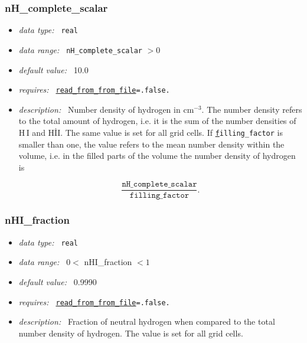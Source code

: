 \documentclass[a4paper,10pt]{article}
\begin{document}
\subsubsection{nH\_complete\_scalar}
\label{opt:nhcompletescalar}
\begin{itemize}
 \item \textit{data type:~} \texttt{real}
 \item \textit{data range:~} \texttt{nH\_complete\_scalar} $> 0$
 \item \textit{default value:~} 10.0
 \item \textit{requires:~} \texttt{\hyperref[opt:readfromfile]{read\_from\_from\_file}=.false.}
 \item \textit{description:~} Number density of hydrogen in $\mathrm{cm^{-3}}$.  
  The number density refers to the total amount of hydrogen, i.e. it is the sum 
  of the number densities of H\,I and H\.II. The same value is set for all grid 
  cells. If \texttt{\hyperref[opt:fillingfactor]filling\_factor} is smaller 
  than one, the value refers to the mean number density within the volume, i.e. 
  in the filled parts of the volume the number density  of hydrogen is

  \begin{equation}
   \frac{\mathtt{nH\_complete\_scalar}}{\mathtt{filling\_factor}} .
 \end{equation} 
\end{itemize}


\subsubsection{nHI\_fraction}
\label{opt:nhifraction}
\begin{itemize}
 \item \textit{data type:~} \texttt{real}
 \item \textit{data range:~} $0<$ nHI\_fraction $<1$
 \item \textit{default value:~} 0.9990
 \item \textit{requires:~} \texttt{\hyperref[opt:readfromfile]{read\_from\_from\_file}=.false.}
 \item \textit{description:~} Fraction of neutral hydrogen when compared to the  
  total number density of hydrogen. The value is set for all grid cells.
\end{itemize}
\end{document}
